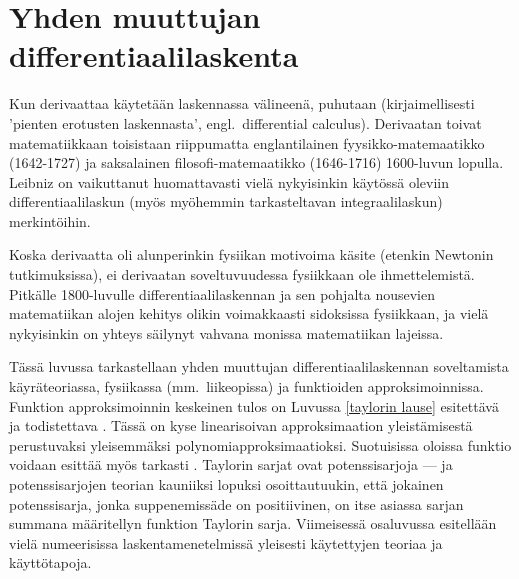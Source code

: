 \chapter{Yhden muuttujan differentiaalilaskenta} 
\label{yhden muuttujan differentiaalilaskenta}

Kun derivaattaa käytetään laskennassa välineenä, puhutaan 
(kirjaimellisesti 'pienten erotusten laskennasta', engl.\ differential calculus). Derivaatan
toivat matematiikkaan toisistaan riippumatta englantilainen fyysikko-matemaatikko
 (1642-1727) ja saksalainen filosofi-matemaatikko 
 (1646-1716) 1600-luvun lopulla. Leibniz on vaikuttanut
huomattavasti vielä nykyisinkin käytössä oleviin differentiaalilaskun
(myös myöhemmin tarkasteltavan integraalilaskun) merkintöihin. 

Koska derivaatta oli alunperinkin fysiikan motivoima käsite (etenkin Newtonin tutkimuksissa),
ei derivaatan soveltuvuudessa fysiikkaan ole ihmettelemistä. Pitkälle 1800-luvulle 
differentiaalilaskennan ja sen pohjalta nousevien matematiikan alojen kehitys olikin 
voimakkaasti sidoksissa fysiikkaan, ja vielä nykyisinkin on yhteys säilynyt vahvana monissa 
matematiikan lajeissa.

Tässä luvussa tarkastellaan yhden muuttujan differentiaalilaskennan soveltamista
käyräteoriassa, fysiikassa (mm.\ liikeopissa) ja funktioiden approksimoinnissa. Funktion
approksimoinnin keskeinen tulos on Luvussa \ref{taylorin lause} esitettävä ja todistettava
. Tässä on kyse linearisoivan approksimaation yleistämisestä
 perustuvaksi yleisemmäksi polynomiapproksimaatioksi. Suotuisissa
oloissa funktio voidaan esittää myös tarkasti . Taylorin sarjat ovat
potenssisarjoja --- ja potenssisarjojen teorian kauniiksi lopuksi osoittautuukin, että
jokainen potenssisarja, jonka suppenemissäde on positiivinen, on itse asiassa sarjan summana
määritellyn funktion Taylorin sarja. Viimeisessä osaluvussa esitellään vielä numeerisissa
laskentamenetelmissä yleisesti käytettyjen  teoriaa ja
käyttötapoja.